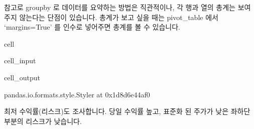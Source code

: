 \documentclass[letterpaper,10pt,english]{jupyterBook}
\begin{document}
\sphinxAtStartPar
 참고로 groupby 로 데이터를 요약하는 방법은 직관적이나, 각 행과 열의 총계는 보여주지 않는다는 단점이 있습니다. 총계가 보고 싶을 때는 pivot\_table 에서 ‘margins=True’ 를 인수로 넣어주면 총계를 볼 수 있습니다.

\begin{sphinxuseclass}{cell}\begin{sphinxVerbatimInput}

\begin{sphinxuseclass}{cell_input}
\begin{sphinxVerbatim}[commandchars=\\\{\}]
             
\end{sphinxVerbatim}

\end{sphinxuseclass}\end{sphinxVerbatimInput}
\begin{sphinxVerbatimOutput}

\begin{sphinxuseclass}{cell_output}
\begin{sphinxVerbatim}[commandchars=\\\{\}]
\PYGZlt{}pandas.io.formats.style.Styler at 0x1d8d6e44af0\PYGZgt{}
\end{sphinxVerbatim}

\end{sphinxuseclass}\end{sphinxVerbatimOutput}

\end{sphinxuseclass}
\sphinxAtStartPar
 최저 수익률(리스크)도 조사합니다. 당일 수익률 높고, 표준화 된 주가가 낮은 좌하단 부분의 리스크가 낮습니다.
\end{document}
